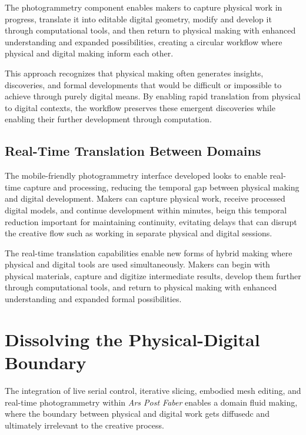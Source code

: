 \vspace{0.5cm}

The photogrammetry component enables makers to capture physical work in progress, translate it into editable digital geometry, modify and develop it through computational tools, and then return to physical making with enhanced understanding and expanded possibilities, creating a circular workflow where physical and digital making inform each other.

\vspace{0.5cm}

This approach recognizes that physical making often generates insights, discoveries, and formal developments that would be difficult or impossible to achieve through purely digital means. By enabling rapid translation from physical to digital contexts, the workflow preserves these emergent discoveries while enabling their further development through computation.

\subsection{Real-Time Translation Between Domains}

The mobile-friendly photogrammetry interface developed looks to enable real-time capture and processing, reducing the temporal gap between physical making and digital development. Makers can capture physical work, receive processed digital models, and continue development within minutes, beign this temporal reduction important for maintaining continuity, evitating delays that can disrupt the creative flow such as working in separate physical and digital sessions.

\vspace{0.5cm}

The real-time translation capabilities enable new forms of hybrid making where physical and digital tools are used simultaneously. Makers can begin with physical materials, capture and digitize intermediate results, develop them further through computational tools, and return to physical making with enhanced understanding and expanded formal possibilities.

\section{Dissolving the Physical-Digital Boundary}

The integration of live serial control, iterative slicing, embodied mesh editing, and real-time photogrammetry within \textit{Ars Post Faber} enables a domain fluid making, where the boundary between physical and digital work gets diffusedc and ultimately irrelevant to the creative process.

